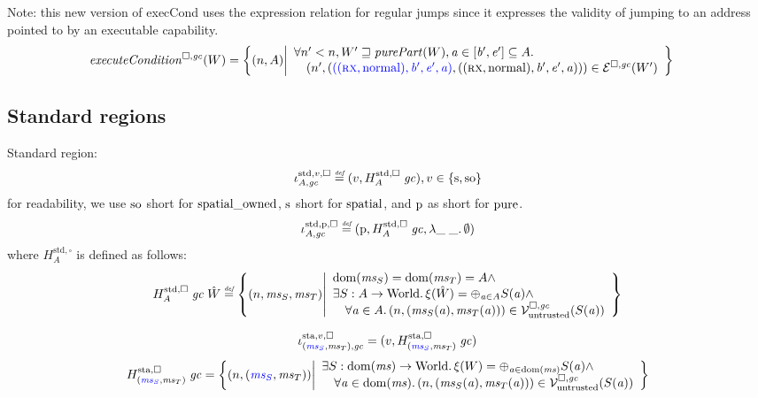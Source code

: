 \documentclass[a4paper]{article}
\begin{document}
Note: this new version of execCond uses the expression relation for regular jumps since it expresses the validity of jumping to an address pointed to by an executable capability. 
\begin{align*}
  \execCond{W} &=
  \left\{ \npair{A} \middle|
    \begin{array}{l}
      \forall n' < n, W' \future \purePart{W}, \aaddr \in [\baddr',\eaddr'] \subseteq A \ldotp\\
      \quad \npair[n']{\stpair[.]{((\rx,\normal),\baddr',\eaddr',\aaddr)}{((\rx,\normal),\baddr',\eaddr',\aaddr)}} \in \lre(W')
    \end{array}
    \right\}
\end{align*}

\subsection{Standard regions}
\label{sec:standard-regions}
Standard region:
\[
  \stdreg{A,\gc}{v} \defeq (v,H_A^{\mathrm{std},\square} \; \gc) , v \in \{\spa,\spao\}
\]
for readability, we use $\spao$ short for $\spatialo$, $\spa$ short for $\spatial$, and $\pur$ as short for $\pure$.
\[
  \stdreg{A,\gc}{\pur} \defeq (\pur,H_A^{\mathrm{std},\square} \; \gc, \lambda \_ \; \_ \ldotp \emptyset)
\]
where $H^{\mathrm{std},\square}_A$ is defined as follows:
\[
  H_A^{\mathrm{std},\square} \; \gc \; \hat{W} \defeq \left\{ \npair{\ms_S,\ms_T} \middle|
    \begin{array}{l}
      \dom(\ms_S) = \dom(\ms_T) = A \wedge \\
      \exists S : A \fun \World \ldotp \xi(\hat{W}) = \oplus_{\aaddr \in A} S(\aaddr) \wedge\\
      \quad \forall \aaddr \in A \ldotp \npair{(\ms_S(\aaddr),\ms_T(\aaddr))} \in \lrv(S(\aaddr))
    \end{array}
  \right\}
\]

\[
  \stareg[\stpair{\ms}{\ms},\gc]{v,\square} = (v,H^\mathrm{sta,\square}_{\stpair{\ms}{\ms}} \; \gc)
\]
\[
  H^\mathrm{sta,\square}_{\stpair{\ms}{\ms}} \; \gc = \left\{ \npair{\stpair{\ms}{\ms}} \middle| 
    \begin{array}{l}
      \exists S : \dom(\ms) \fun \World \ldotp \xi(W) = \oplus_{\aaddr \in \dom(\ms)} S(\aaddr) \wedge\\
      \quad \forall \aaddr \in \dom(\ms) \ldotp \npair{(\ms_S(\aaddr),\ms_T(\aaddr))} \in \lrv(S(\aaddr))
    \end{array}
\right\}
\]
\end{document}
